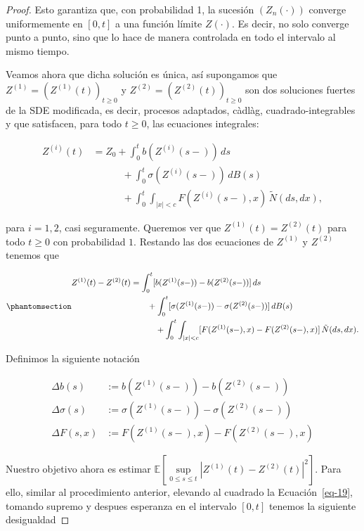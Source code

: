 \documentclass[
  spanish,
  us-letterpaper,
]{scrreprt}
\theoremstyle{plain}
\theoremstyle{plain}
\theoremstyle{definition}
\theoremstyle{plain}
\theoremstyle{remark}
\begin{document}
\begin{proof}
Esto garantiza que, con probabilidad 1, la sucesión \((Z_n(\cdot))\)
converge uniformemente en \([0,t]\) a una función límite \(Z(\cdot)\).
Es decir, no solo converge punto a punto, sino que lo hace de manera
controlada en todo el intervalo al mismo tiempo.

Veamos ahora que dicha solución es única, así supongamos que
\(Z^{(1)}= (Z^{(1)}(t))_{t \geq 0}\) y
\(Z^{(2)} = (Z^{(2)}(t))_{t \geq 0}\) son dos soluciones fuertes de la
SDE modificada, es decir, procesos adaptados, càdlàg,
cuadrado-integrables y que satisfacen, para todo \(t \geq 0\), las
ecuaciones integrales:

\[
    \begin{aligned}
        Z^{(i)}(t) & = Z_0 + \int_0^t b(Z^{(i)}(s-))\,ds\\ 
        & \qquad \quad + \int_0^t \sigma(Z^{(i)}(s-))\,dB(s)\\ 
        & \qquad\quad + \int_0^t \int_{|x|<c} F(Z^{(i)}(s-), x)\,\tilde{N}(ds,dx),
    \end{aligned}
\]

para \(i=1,2\), casi seguramente. Queremos ver que
\(Z^{(1)}(t) = Z^{(2)}(t)\) para todo \(t\geq 0\) con probabilidad
\(1\). Restando las dos ecuaciones de \(Z^{(1)}\) y \(Z^{(2)}\) tenemos
que

\begin{equation}\phantomsection\label{eq-19}{
    \begin{aligned}
        Z^{(1)}(t) - Z^{(2)}(t) & = \int_0^t [b(Z^{(1)}(s-)) - b(Z^{(2)}(s-))]\,ds\\ 
        & \qquad + \int_0^t [\sigma(Z^{(1)}(s-)) - \sigma(Z^{(2)}(s-))]\,dB(s)\\ 
        & \qquad\quad + \int_0^t \int_{|x|<c} [F(Z^{(1)}(s-), x) - F(Z^{(2)}(s-), x)]\,\tilde{N}(ds,dx). 
    \end{aligned}
}\end{equation}

Definimos la siguiente notación

\[
    \begin{aligned}
        \Delta b(s) & :=b(Z^{(1)}(s-))-b(Z^{(2)}(s-))\\ 
        \Delta \sigma(s) & := \sigma(Z^{(1)}(s-))-\sigma(Z^{(2)}(s-))\\ 
        \Delta F(s,x) & := F(Z^{(1)}(s-),x)-F(Z^{(2)}(s-),x)
    \end{aligned}
\]

Nuestro objetivo ahora es estimar
\(\displaystyle \mathbb{E}\left[\sup\limits_{0\leq s\leq t}|Z^{(1)}(t) - Z^{(2)}(t)|^2\right]\).
Para ello, similar al procedimiento anterior, elevando al cuadrado la
Ecuación~\ref{eq-19}, tomando supremo y despues esperanza en el
intervalo \([0,t]\) tenemos la siguiente desigualdad


\end{proof}
\end{document}
